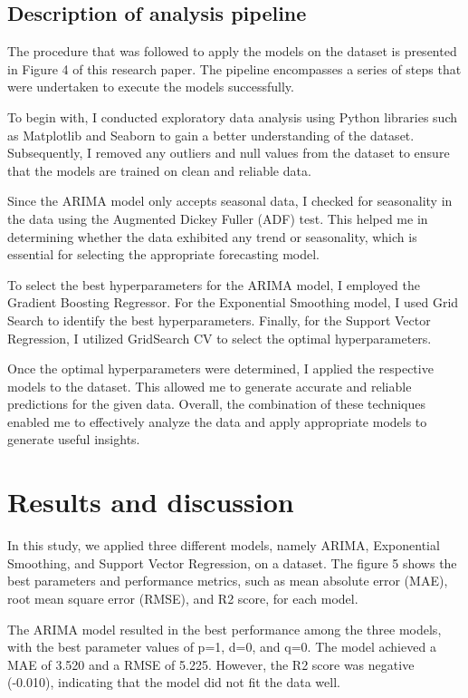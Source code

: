 \documentclass[conference,letterpaper]{IEEEtran}
\begin{document}
\subsection{Description of analysis pipeline}
The procedure that was followed to apply the models on the dataset is presented in Figure 4 of this research paper. The pipeline encompasses a series of steps that were undertaken to execute the models successfully.

To begin with, I conducted exploratory data analysis using Python libraries such as Matplotlib and Seaborn to gain a better understanding of the dataset. Subsequently, I removed any outliers and null values from the dataset to ensure that the models are trained on clean and reliable data.

Since the ARIMA model only accepts seasonal data, I checked for seasonality in the data using the Augmented Dickey Fuller (ADF) test. This helped me in determining whether the data exhibited any trend or seasonality, which is essential for selecting the appropriate forecasting model.

To select the best hyperparameters for the ARIMA model, I employed the Gradient Boosting Regressor. For the Exponential Smoothing model, I used Grid Search to identify the best hyperparameters. Finally, for the Support Vector Regression, I utilized GridSearch CV to select the optimal hyperparameters.

Once the optimal hyperparameters were determined, I applied the respective models to the dataset. This allowed me to generate accurate and reliable predictions for the given data. Overall, the combination of these techniques enabled me to effectively analyze the data and apply appropriate models to generate useful insights.

\section{Results and discussion}

In this study, we applied three different models, namely ARIMA, Exponential Smoothing, and Support Vector Regression, on a dataset. The figure 5 shows the best parameters and performance metrics, such as mean absolute error (MAE), root mean square error (RMSE), and R2 score, for each model.

The ARIMA model resulted in the best performance among the three models, with the best parameter values of p=1, d=0, and q=0. The model achieved a MAE of 3.520 and a RMSE of 5.225. However, the R2 score was negative (-0.010), indicating that the model did not fit the data well.
\end{document}
